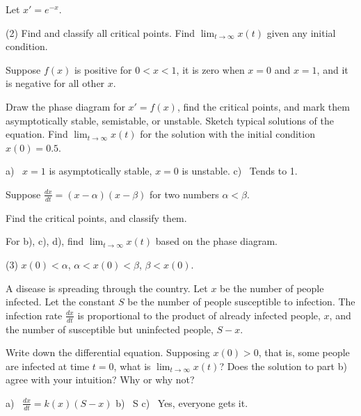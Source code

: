 \begin{exercise}\ansMark%
Let $x'=e^{-x}$.
\begin{tasks}(2)
\task Find and classify all critical points.
\task Find $\displaystyle \lim_{t\to\infty} x(t)$ given any 
initial condition.
\end{tasks}
\end{exercise}


\begin{exercise}
Suppose $f(x)$ is positive for $0 < x < 1$, it is zero when $x=0$ and $x=1$,
and it is negative for all other $x$.
\begin{tasks}
\task Draw the phase diagram for $x' = f(x)$,
find the critical points, and mark them asymptotically stable, semistable, or unstable.
\task Sketch typical solutions of the equation.
\task Find $\displaystyle \lim_{t\to \infty} x(t)$ for the solution with the initial condition
$x(0) = 0.5$.
\end{tasks}
\end{exercise}
\comboSol{%
}
{%
a)~ $x=1$ is asymptotically stable, $x=0$ is unstable. \quad c)~ Tends to 1.
}

\begin{exercise}\ansMark%
Suppose $\frac{dx}{dt} = (x-\alpha)(x-\beta)$ for two numbers $\alpha <
\beta$.
\begin{tasks}
\task Find the critical points, and classify them.
\end{tasks}
For b), c), d), find $\displaystyle \lim_{t\to\infty} x(t)$ based on
the phase diagram.
\begin{tasks}[resume](3)
\task $x(0) < \alpha$,
\task $\alpha < x(0) < \beta$,
\task $\beta < x(0)$.
\end{tasks}
\end{exercise}

\begin{exercise}
A disease is spreading through the country.  Let $x$ be the number of people
infected.  Let the constant $S$ be the number of people susceptible to
infection.  The infection rate $\frac{dx}{dt}$ is proportional to the product
of already infected people, $x$, and the number of susceptible but
uninfected people, $S-x$.
\begin{tasks}
\task Write down the differential equation.
\task Supposing $x(0) > 0$, that is, some people are infected at time $t=0$,
what is
$\displaystyle \lim_{t\to\infty} x(t)$?
\task Does the solution to part b) agree with your intuition?  Why or why not?
\end{tasks}
\end{exercise}
\comboSol{%
}
{%
a)~ $\frac{dx}{dt} = k(x)(S - x)$ \quad b)~ S \qquad c)~ Yes, everyone gets it.
}


\setcounter{exercise}{100}

